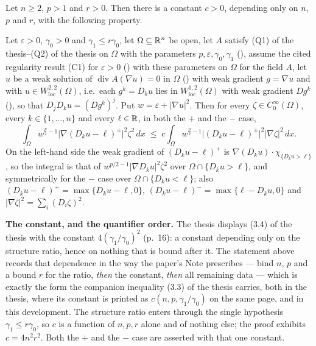 \begin{helper}[Inequality (3.4)]
Let $n\ge2$, $p>1$ and $r>0$.  Then there is a constant $c>0$, depending only on
$n$, $p$ and $r$, with the following property.

Let $\varepsilon>0$, $\gamma_0>0$ and $\gamma_1\le r\gamma_0$, let
$\Omega\subseteq\mathbb{R}^n$ be open, let $A$ satisfy (Q1) of the thesis--(Q2) of the thesis on
$\Omega$ with the parameters $p,\varepsilon,\gamma_0,\gamma_1$
(), assume the cited regularity result (C1) for
$\varepsilon>0$ () with these parameters on
$\Omega$ for the field $A$, let $u$ be a weak solution of
$\operatorname{div}A(\nabla u)=0$ in $\Omega$ () with
weak gradient $g=\nabla u$ and with $u\in W^{2,2}_{\mathrm{loc}}(\Omega)$, i.e.\
each $g^k=D_ku$ lies in $W^{1,2}_{\mathrm{loc}}(\Omega)$ with weak gradient
$Dg^k$ (\noderef{MemW1pLocOn}), so that $D_jD_ku=(Dg^k)^j$.  Put
$w=\varepsilon+|\nabla u|^2$.  Then for every $\zeta\in C_0^\infty(\Omega)$,
every $k\in\{1,\dots,n\}$ and every $\ell\in\mathbb{R}$, in both the $+$ and the $-$
case,
\[
\int_\Omega w^{\frac p2-1}\bigl|\nabla(D_ku-\ell)^{\pm}\bigr|^2\zeta^2\,dx
\;\le\;c
\int_\Omega w^{\frac p2-1}\bigl|(D_ku-\ell)^{\pm}\bigr|^2|\nabla\zeta|^2\,dx .
\]
On the left-hand side the weak gradient of $(D_ku-\ell)^+$ is
$\nabla(D_ku)\cdot\chi_{\{D_ku>\ell\}}$, so the integral is that of
$w^{p/2-1}|\nabla D_ku|^2\zeta^2$ over $\Omega\cap\{D_ku>\ell\}$, and
symmetrically for the $-$ case over $\Omega\cap\{D_ku<\ell\}$; also
$(D_ku-\ell)^+=\max\{D_ku-\ell,0\}$, $(D_ku-\ell)^-=\max\{\ell-D_ku,0\}$ and
$|\nabla\zeta|^2=\sum_i(D_i\zeta)^2$.

\noindent\textbf{The constant, and the quantifier order.}  The thesis displays
(3.4) of the thesis with the constant $4(\gamma_1/\gamma_0)^2$ (p.~16): a constant
depending only on the structure ratio, hence on nothing that is bound after it.
The statement above records that dependence in the way the paper's Note
prescribes --- bind $n$, $p$ and a bound $r$ for the ratio, \emph{then} the
constant, \emph{then} all remaining data --- which is exactly the form the
companion inequality (3.3) of the thesis carries, both in the thesis, where its
constant is printed as $c(n,p,\gamma_1/\gamma_0)$ on the same page, and in this
development.  The structure ratio enters through the single hypothesis
$\gamma_1\le r\gamma_0$, so $c$ is a function of $n,p,r$ alone and of nothing
else; the proof exhibits $c=4n^2r^2$.  Both the $+$ and the $-$ case are
asserted with that one constant.


\end{helper}
